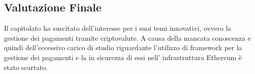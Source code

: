 \subsection{Valutazione Finale}
Il capitolato ha suscitato dell'interesse per i suoi temi innovativi, ovvero la gestione dei pagamenti tramite criptovalute. A causa della mancata conoscenza e quindi dell'eccessivo carico di studio riguardante l'utilizzo di framework per la gestione dei pagamenti e la in sicurezza di essi nell' infrastruttura Ethereum è stato scartato. 